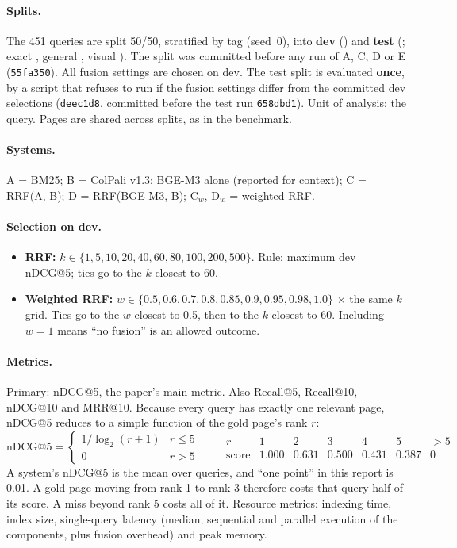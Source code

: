 \documentclass[11pt,a4paper]{article}
\begin{document}
\paragraph{Splits.}
The 451 queries are split 50/50, stratified by tag (seed~0), into \textbf{dev} (\nDev{}) and \textbf{test} (\nTest{}; exact \nexact{}, general \ngeneral{}, visual \nvisual{}). The split was committed before any run of A, C, D or E (\texttt{55fa350}).
All fusion settings are chosen on dev. The test split is evaluated \textbf{once}, by a script that refuses to run if the fusion settings differ from the committed dev selections (\texttt{deec1d8}, committed before the test run \texttt{658dbd1}). Unit of analysis: the query. Pages are shared across splits, as in the benchmark.

\paragraph{Systems.}
A = BM25; B = ColPali v1.3; BGE-M3 alone (reported for context); C = RRF(A, B); D = RRF(BGE-M3, B); C$_w$, D$_w$ = weighted RRF.

\paragraph{Selection on dev.}
\begin{itemize}
  \item \textbf{RRF:} $k \in \{1,5,10,20,40,60,80,100,200,500\}$. Rule: maximum dev nDCG@5; ties go to the $k$ closest to 60.
  \item \textbf{Weighted RRF:} $w \in \{0.5,0.6,0.7,0.8,0.85,0.9,0.95,0.98,1.0\}$ $\times$ the same $k$ grid. Ties go to the $w$ closest to 0.5, then to the $k$ closest to 60. Including $w=1$ means ``no fusion'' is an allowed outcome.
\end{itemize}

\paragraph{Metrics.}
Primary: nDCG@5, the paper's main metric. Also Recall@5, Recall@10, nDCG@10 and MRR@10.
Because every query has exactly one relevant page, nDCG@5 reduces to a simple function of the gold page's rank $r$:
\[
\mathrm{nDCG@5} = \begin{cases} 1/\log_2(r+1) & r \le 5 \\ 0 & r > 5 \end{cases}
\qquad
\begin{array}{c|ccccc|c} r & 1 & 2 & 3 & 4 & 5 & {>}5 \\ \hline \text{score} & 1.000 & 0.631 & 0.500 & 0.431 & 0.387 & 0 \end{array}
\]
A system's nDCG@5 is the mean over queries, and ``one point'' in this report is 0.01. A gold page moving from rank 1 to rank 3 therefore costs that query half of its score. A miss beyond rank 5 costs all of it.
Resource metrics: indexing time, index size, single-query latency (median; sequential and parallel execution of the components, plus fusion overhead) and peak memory.
\end{document}
